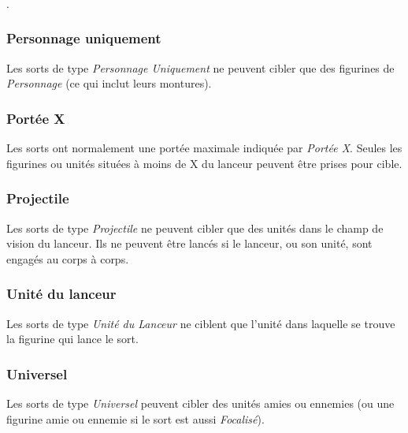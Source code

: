 \subsubsection*{}

.

\subsubsection*{Personnage uniquement}

Les sorts de type \emph{Personnage Uniquement} ne peuvent cibler que des figurines de \emph{Personnage} (ce qui inclut leurs montures).

\subsubsection*{Portée \unit{X}{\pouce}}

Les sorts ont normalement une portée maximale indiquée par \emph{Portée \unit{X}{\pouce}}. Seules les figurines ou unités situées à moins de \unit{X}{\pouce} du lanceur peuvent être prises pour cible.

\subsubsection*{Projectile}

Les sorts de type \emph{Projectile} ne peuvent cibler que des unités dans le champ de vision du lanceur. Ils ne peuvent être lancés si le lanceur, ou son unité, sont engagés au corps à corps.

\subsubsection*{Unité du lanceur}

Les sorts de type \emph{Unité du Lanceur} ne ciblent que l'unité dans laquelle se trouve la figurine qui lance le sort.

\subsubsection*{Universel}

Les sorts de type \emph{Universel} peuvent cibler des unités amies ou ennemies (ou une figurine amie ou ennemie si le sort est aussi \emph{Focalisé}).

